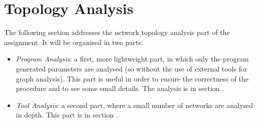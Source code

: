 \documentclass[11pt, a4paper]{report}
\begin{document}
\section*{Topology Analysis}
	The following section addresses the network topology analysis part of the assignment. 
	It will be organised in two parts:
	\begin{itemize}
		\item \emph{Program Analysis}: a first, more lightweight part, in which only the program generated parameters are analysed (so without the use of external tools for graph analysis). 
		This part is useful in order to ensure the correctness of the procedure and to see some small details. The analysis is in section .
		\item \emph{Tool Analysis}: a second part, where a small number of networks are analysed in depth. This part is in section .
	\end{itemize}
\end{document}
